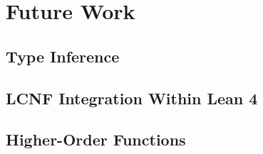 \chapter{Future Work}\label{sec:futurework}

\section{Type Inference}

\section{LCNF Integration Within Lean 4}

\section{Higher-Order Functions}